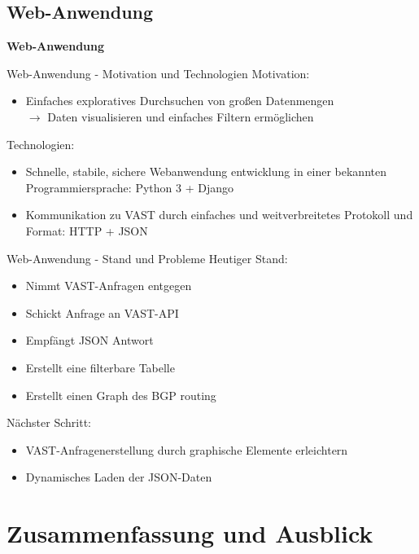 \documentclass[9pt]{beamer}
\begin{document}
\subsection{Web-Anwendung}

	\begin{frame}{}
		\begin{center}
			\LARGE \textbf{Web-Anwendung}
		\end{center}
	\end{frame}

\begin{frame}{Web-Anwendung - Motivation und Technologien}{}
	Motivation:
	\begin{itemize}
		\item Einfaches exploratives Durchsuchen von großen Datenmengen\\
			$\rightarrow$ Daten visualisieren und einfaches Filtern ermöglichen
	\end{itemize}
	Technologien:
	\begin{itemize}
		\item Schnelle, stabile, sichere Webanwendung entwicklung in einer bekannten Programmiersprache:  Python 3 + Django
			
		\item Kommunikation zu VAST durch einfaches  und weitverbreitetes Protokoll und Format: HTTP + JSON
	\end{itemize}
\end{frame}

\begin{frame}{Web-Anwendung - Stand und Probleme}
	Heutiger Stand:
	\begin{itemize}
		\item Nimmt VAST-Anfragen entgegen 
		\item Schickt Anfrage an VAST-API
		\item Empfängt JSON Antwort 
		\item Erstellt eine filterbare Tabelle
		\item Erstellt einen Graph des BGP routing
	\end{itemize}
	Nächster Schritt:
	\begin{itemize}
		\item VAST-Anfragenerstellung durch graphische Elemente erleichtern
		\item Dynamisches Laden der JSON-Daten
	\end{itemize}
\end{frame}

\section{Zusammenfassung und Ausblick}
\end{document}
